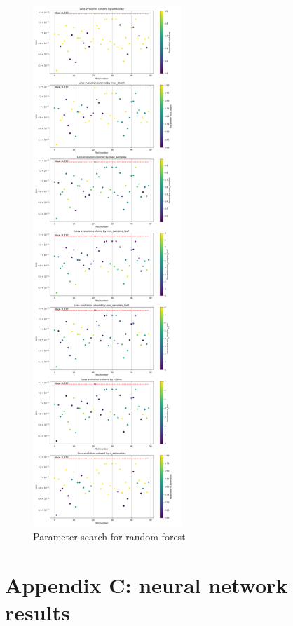 \documentclass{article}
\begin{document}
    \begin{figure}[H]
        \centering
        \includegraphics[width=0.5\textwidth]{report_img/param_search/random_forest}
        \caption{Parameter search for random forest}
        \label{fig:}
    \end{figure}


    \section{Appendix C: neural network results}\label{sec:appendixC}
\end{document}
